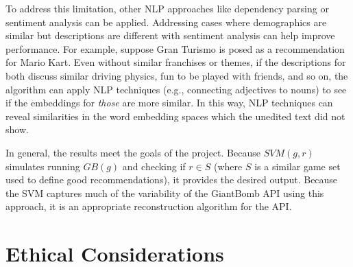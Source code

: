 \documentclass[10pt,twocolumn]{article}
\begin{document}
To address this limitation, other NLP approaches like dependency parsing or sentiment analysis can be applied. \cite{Ryan_47} Addressing cases where demographics are similar but descriptions are different with sentiment analysis can help improve performance. For example, suppose Gran Turismo is posed as a recommendation for Mario Kart. Even without similar franchises or themes, if the descriptions for both discuss similar driving physics, fun to be played with friends, and so on, the algorithm can apply NLP techniques (e.g., connecting adjectives to nouns) to see if the embeddings for \textit{those} are more similar. \cite{Meidl} In this way, NLP techniques can reveal similarities in the word embedding spaces which the unedited text did not show.

In general, the results meet the goals of the project. Because $SVM(g, r)$ simulates running $GB(g)$ and checking if $r \in S$ (where $S$ is a similar game set used to define good recommendations), it provides the desired output. Because the SVM captures much of the variability of the GiantBomb API using this approach, it is an appropriate reconstruction algorithm for the API. 

\section{Ethical Considerations}

\end{document}
